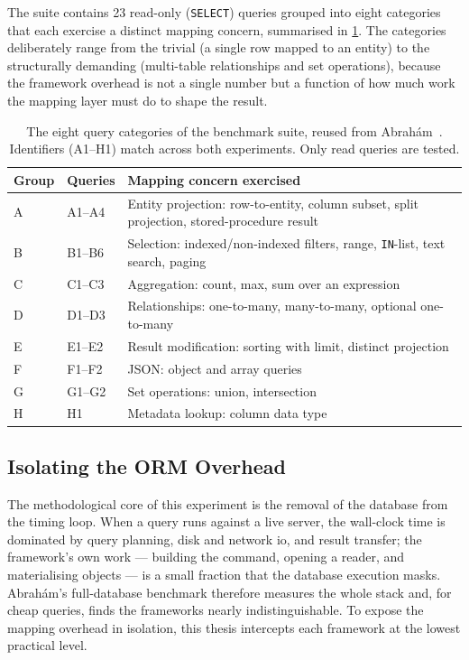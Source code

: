 The suite contains 23 read-only (\texttt{SELECT}) queries grouped into eight categories that each exercise a distinct mapping concern, summarised in \cref{tab:overhead-queries}. The categories deliberately range from the trivial (a single row mapped to an entity) to the structurally demanding (multi-table relationships and set operations), because the framework overhead is not a single number but a function of how much work the mapping layer must do to shape the result.

\begin{table}[H]
\centering
\caption[ORM benchmark query categories]{The eight query categories of the benchmark suite, reused from Abrahám~\cite{abrahamFrameworkAgnosticQueryAdaptation2025}. Identifiers (A1--H1) match across both experiments. Only read queries are tested.}
\label{tab:overhead-queries}
\begin{tabularx}{\columnwidth}{@{}llX@{}}
\toprule
Group & Queries & Mapping concern exercised \\
\midrule
A & A1--A4 & Entity projection: row-to-entity, column subset, split projection, stored-procedure result \\
B & B1--B6 & Selection: indexed/non-indexed filters, range, \texttt{IN}-list, text search, paging \\
C & C1--C3 & Aggregation: count, max, sum over an expression \\
D & D1--D3 & Relationships: one-to-many, many-to-many, optional one-to-many \\
E & E1--E2 & Result modification: sorting with limit, distinct projection \\
F & F1--F2 & JSON: object and array queries \\
G & G1--G2 & Set operations: union, intersection \\
H & H1 & Metadata lookup: column data type \\
\bottomrule
\end{tabularx}
\end{table}

\subsection{Isolating the ORM Overhead}
\label{sec:overhead-method}

The methodological core of this experiment is the removal of the database from the timing loop. When a query runs against a live server, the wall-clock time is dominated by query planning, disk and network \acrshort{io}, and result transfer; the framework's own work --- building the command, opening a reader, and materialising objects --- is a small fraction that the database execution masks. Abrahám's full-database benchmark therefore measures the whole stack and, for cheap queries, finds the frameworks nearly indistinguishable. To expose the mapping overhead in isolation, this thesis intercepts each framework at the lowest practical level.

